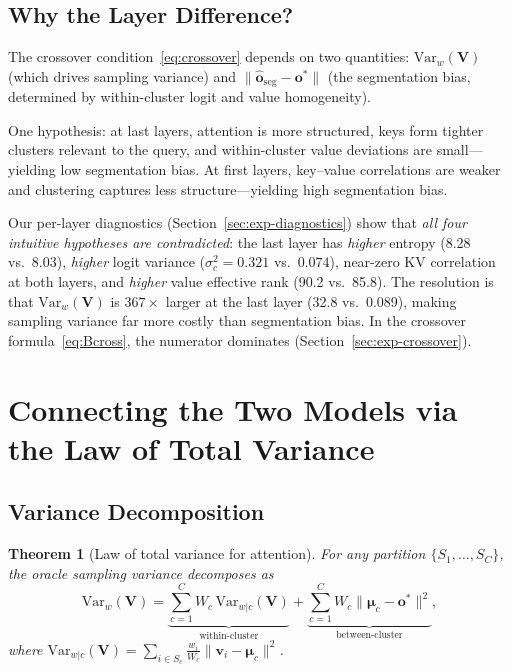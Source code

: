 \documentclass[11pt,a4paper]{article}
\newtheorem{theorem}{Theorem}[section]
\theoremstyle{definition}
\newcommand{\vv}{\mathbf{v}}
\newcommand{\oo}{\mathbf{o}}
\newcommand{\bmu}{\boldsymbol{\mu}}
\newcommand{\Var}{\mathrm{Var}}
\begin{document}
\subsection{Why the Layer Difference?}\label{sec:layer-diff}

The crossover condition~\eqref{eq:crossover} depends on two quantities:
$\Var_w(\mathbf{V})$ (which drives sampling variance) and
$\|\hat{\oo}_{\mathrm{seg}}-\oo^*\|$ (the segmentation bias, determined by
within-cluster logit and value homogeneity).

One hypothesis: at last layers, attention is more structured, keys form
tighter clusters relevant to the query, and within-cluster value deviations
are small---yielding low segmentation bias.  At first layers, key--value
correlations are weaker and clustering captures less structure---yielding high
segmentation bias.

\begin{researchnote}
Our per-layer diagnostics (Section~\ref{sec:exp-diagnostics}) show that
\emph{all four intuitive hypotheses are contradicted}: the last layer has
\emph{higher} entropy (8.28 vs.\ 8.03), \emph{higher} logit variance
($\sigma_c^2 = 0.321$ vs.\ $0.074$), near-zero KV correlation at both layers,
and \emph{higher} value effective rank (90.2 vs.\ 85.8).
The resolution is that $\Var_w(\mathbf{V})$ is $367\times$ larger at the last
layer (32.8 vs.\ 0.089), making sampling variance far more costly than
segmentation bias.  In the crossover formula~\eqref{eq:Bcross}, the numerator
dominates (Section~\ref{sec:exp-crossover}).
\end{researchnote}


\section{Connecting the Two Models via the Law of Total Variance}
\label{sec:totalvar}

\subsection{Variance Decomposition}

\begin{theorem}[Law of total variance for attention]\label{thm:totalvar}
For any partition $\{S_1,\dots,S_C\}$, the oracle sampling variance decomposes
as
\begin{equation}\label{eq:totalvar}
  \Var_w(\mathbf{V})
  = \underbrace{\sum_{c=1}^{C}W_c\,\Var_{w|c}(\mathbf{V})}
      _{\textrm{within-cluster}}
  + \underbrace{\sum_{c=1}^{C}W_c\|\bmu_c - \oo^{*}\|^{2}}
      _{\textrm{between-cluster}},
\end{equation}
where
$\Var_{w|c}(\mathbf{V})=\sum_{i\in S_c}\frac{w_i}{W_c}\|\vv_i-\bmu_c\|^2$.
\end{theorem}
\end{document}
